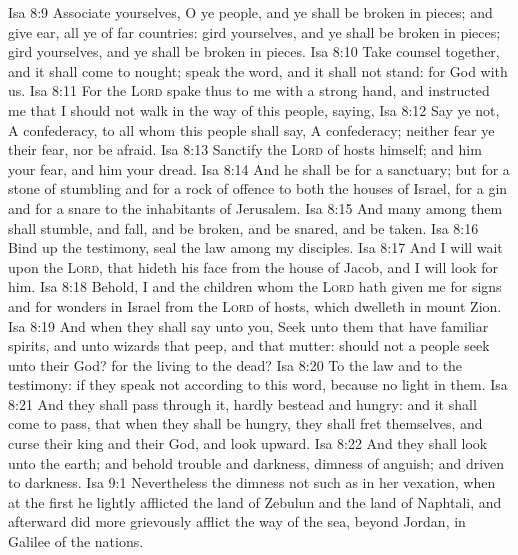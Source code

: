 \vs Isa 8:9 Associate yourselves, O ye people, and ye shall be broken in pieces; and give ear, all ye of far countries: gird yourselves, and ye shall be broken in pieces; gird yourselves, and ye shall be broken in pieces.
\vs Isa 8:10 Take counsel together, and it shall come to nought; speak the word, and it shall not stand: for God  with us.
\vs Isa 8:11 For the \textsc{Lord} spake thus to me with a strong hand, and instructed me that I should not walk in the way of this people, saying,
\vs Isa 8:12 Say ye not, A confederacy, to all  whom this people shall say, A confederacy; neither fear ye their fear, nor be afraid.
\vs Isa 8:13 Sanctify the \textsc{Lord} of hosts himself; and  him  your fear, and  him  your dread.
\vs Isa 8:14 And he shall be for a sanctuary; but for a stone of stumbling and for a rock of offence to both the houses of Israel, for a gin and for a snare to the inhabitants of Jerusalem.
\vs Isa 8:15 And many among them shall stumble, and fall, and be broken, and be snared, and be taken.
\vs Isa 8:16 Bind up the testimony, seal the law among my disciples.
\vs Isa 8:17 And I will wait upon the \textsc{Lord}, that hideth his face from the house of Jacob, and I will look for him.
\vs Isa 8:18 Behold, I and the children whom the \textsc{Lord} hath given me  for signs and for wonders in Israel from the \textsc{Lord} of hosts, which dwelleth in mount Zion.
\vs Isa 8:19 And when they shall say unto you, Seek unto them that have familiar spirits, and unto wizards that peep, and that mutter: should not a people seek unto their God? for the living to the dead?
\vs Isa 8:20 To the law and to the testimony: if they speak not according to this word,  because  no light in them.
\vs Isa 8:21 And they shall pass through it, hardly bestead and hungry: and it shall come to pass, that when they shall be hungry, they shall fret themselves, and curse their king and their God, and look upward.
\vs Isa 8:22 And they shall look unto the earth; and behold trouble and darkness, dimness of anguish; and  driven to darkness.
\vs Isa 9:1 Nevertheless the dimness  not  such as  in her vexation, when at the first he lightly afflicted the land of Zebulun and the land of Naphtali, and afterward did more grievously afflict  the way of the sea, beyond Jordan, in Galilee of the nations.

